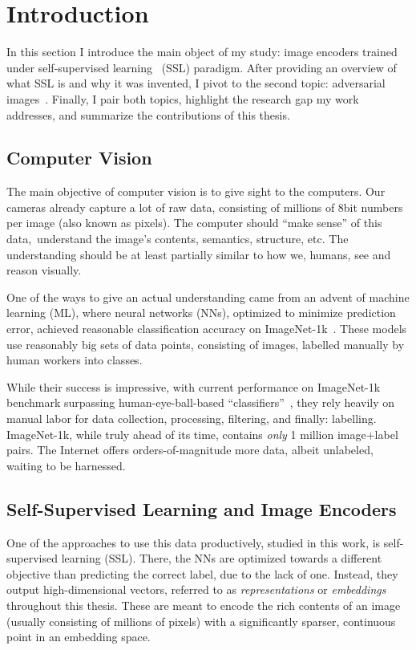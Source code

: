 \chapter{Introduction}
\label{chap:introduction}

In this section I introduce the main object of my study: image encoders trained under self-supervised learning~\cite{ogssl} (SSL) paradigm. After providing an overview of what SSL is and why it was invented, I pivot to the second topic: adversarial images~\cite{advex}. Finally, I pair both topics, highlight the research gap my work addresses, and summarize the contributions of this thesis.

\section{Computer Vision}

The main objective of computer vision is to give sight to the computers. Our cameras already capture a lot of raw data, consisting of millions of 8bit numbers per image (also known as pixels). The computer should ``make sense'' of this data,~\ie understand the image's contents, semantics, structure, etc. The understanding should be at least partially similar to how we, humans, see and reason visually. 

One of the ways to give an actual understanding came from an advent of machine learning (ML), where neural networks (NNs), optimized to minimize prediction error, achieved reasonable classification accuracy on ImageNet-1k~\cite{imagenet,alexnet}. These models use reasonably big sets of data points, consisting of images, labelled manually by human workers into classes.

While their success is impressive, with current performance on ImageNet-1k benchmark surpassing human-eye-ball-based ``classifiers''~\cite{resnet_imagenet}, they rely heavily on manual labor for data collection, processing, filtering, and finally: labelling. ImageNet-1k, while truly ahead of its time, contains \textit{only} 1 million image+label pairs. The Internet offers orders-of-magnitude more data, albeit unlabeled, waiting to be harnessed.

\section{Self-Supervised Learning and Image Encoders}

One of the approaches to use this data productively, studied in this work, is self-supervised learning (SSL). There, the NNs are optimized towards a different objective than predicting the correct label, due to the lack of one. Instead, they output high-dimensional vectors, referred to as \textit{representations} or \textit{embeddings} throughout this thesis. These are meant to encode the rich contents of an image (usually consisting of millions of pixels) with a significantly sparser, continuous point in an embedding space. 

